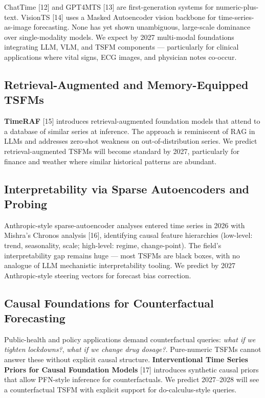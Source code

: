 \documentclass{article}
\begin{document}
ChatTime {[}12{]} and GPT4MTS {[}13{]} are first-generation systems for numeric-plus-text. VisionTS {[}14{]} uses a Masked Autoencoder vision backbone for time-series-as-image forecasting. None has yet shown unambiguous, large-scale dominance over single-modality models. We expect by 2027 multi-modal foundations integrating LLM, VLM, and TSFM components --- particularly for clinical applications where vital signs, ECG images, and physician notes co-occur.

\subsection{Retrieval-Augmented and Memory-Equipped TSFMs}\label{retrieval-augmented-and-memory-equipped-tsfms}

\textbf{TimeRAF} \citep{zhang20252025} {[}15{]} introduces retrieval-augmented foundation models that attend to a database of similar series at inference. The approach is reminiscent of RAG in LLMs and addresses zero-shot weakness on out-of-distribution series. We predict retrieval-augmented TSFMs will become standard by 2027, particularly for finance and weather where similar historical patterns are abundant.

\subsection{Interpretability via Sparse Autoencoders and Probing}\label{interpretability-via-sparse-autoencoders-and-probing}

Anthropic-style sparse-autoencoder analyses entered time series in 2026 with Mishra's Chronos analysis {[}16{]}, identifying causal feature hierarchies (low-level: trend, seasonality, scale; high-level: regime, change-point). The field's interpretability gap remains huge --- most TSFMs are black boxes, with no analogue of LLM mechanistic interpretability tooling. We predict by 2027 Anthropic-style steering vectors for forecast bias correction.

\subsection{Causal Foundations for Counterfactual Forecasting}\label{causal-foundations-for-counterfactual-forecasting}

Public-health and policy applications demand counterfactual queries: \emph{what if we tighten lockdowns?}, \emph{what if we change drug dosage?}. Pure-numeric TSFMs cannot answer these without explicit causal structure. \textbf{Interventional Time Series Priors for Causal Foundation Models} \citep{thumm2026interventionaltime} {[}17{]} introduces synthetic causal priors that allow PFN-style inference for counterfactuals. We predict 2027--2028 will see a counterfactual TSFM with explicit support for do-calculus-style queries.
\end{document}
